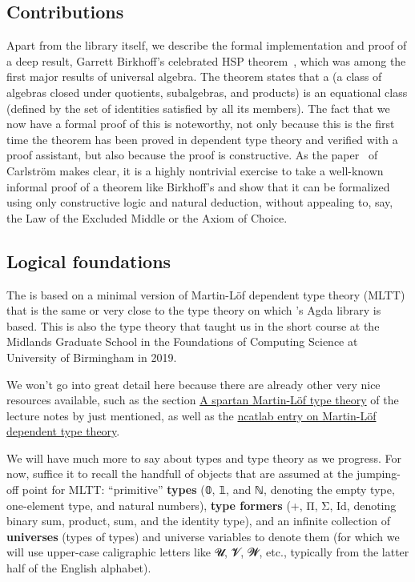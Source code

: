 \subsection*{Contributions}\label{sec:contributions}
Apart from the library itself, we describe the formal implementation and proof of a deep result, Garrett Birkhoff's celebrated HSP theorem~\cite{Birkhoff:1935}, which was among the first major results of universal algebra.  The theorem states that a  (a class of algebras closed under quotients, subalgebras, and products) is an equational class (defined by the set of identities satisfied by all its members).  %
The fact that we now have a formal proof of this is noteworthy, not only because this is the first time the theorem has been proved in dependent type theory and verified with a proof assistant, but also because the proof is constructive. As the paper~\cite{Carlstrom:2008} of Carlstr\"om makes clear, it is a highly nontrivial exercise to take a well-known informal proof of a theorem like Birkhoff's and show that it can be formalized using only constructive logic and natural deduction, without appealing to, say, the Law of the Excluded Middle or the Axiom of Choice.


\subsection*{Logical foundations}
The \agdaualib is based on a minimal version of Martin-Löf dependent type theory (MLTT) that is the same or very close to the type theory on which \MartinEscardo's \TypeTopology Agda library is based. This is also the type theory
that \escardo taught us in the short course \ufcourse at the Midlands Graduate School in the Foundations of Computing Science at University of Birmingham in 2019.

We won't go into great detail here because there are already other very nice resources available, such as the section \href{https://www.cs.bham.ac.uk/~mhe/HoTT-UF-in-Agda-Lecture-Notes/HoTT-UF-Agda.html\#mlttinagda}{A spartan Martin-Löf type theory} of the lecture notes by \escardo just mentioned, as well as the \href{https://ncatlab.org/nlab/show/Martin-L\%C3\%B6f+dependent+type+theory}{ncatlab entry on Martin-Löf dependent type theory}.

We will have much more to say about types and type theory as we progress. For now, suffice it to recall the handfull of objects that are assumed at the jumping-off point for MLTT: ``primitive'' \textbf{types} (𝟘, 𝟙, and ℕ, denoting the empty type, one-element type, and natural numbers), \textbf{type formers} (+, Π, Σ, Id, denoting binary sum, product, sum, and the identity type), and an infinite collection of \textbf{universes} (types of types) and universe variables to denote them (for which we will use upper-case caligraphic letters like 𝓤, 𝓥, 𝓦, etc., typically from the latter half of the English alphabet).

